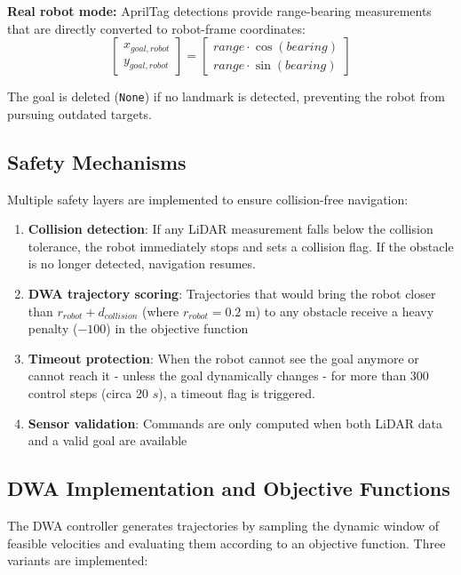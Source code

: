 \textbf{Real robot mode:} AprilTag detections provide range-bearing measurements that are directly converted to robot-frame coordinates:
\begin{equation}
    \begin{bmatrix} x_{goal,robot} \\ y_{goal,robot} \end{bmatrix} = 
    \begin{bmatrix} range \cdot \cos(bearing) \\ range \cdot \sin(bearing) \end{bmatrix}
\end{equation}

The goal is deleted (\texttt{None}) if no landmark is detected, preventing the robot from pursuing outdated targets.

\subsection{Safety Mechanisms}

Multiple safety layers are implemented to ensure collision-free navigation:

\begin{enumerate}
    \item \textbf{Collision detection}: If any LiDAR measurement falls below the collision tolerance, the robot immediately stops and sets a collision flag. If the obstacle is no longer detected, navigation resumes.
    \item \textbf{DWA trajectory scoring}: Trajectories that would bring the robot closer than $r_{robot} + d_{collision}$ (where $r_{robot} = 0.2$ m) to any obstacle receive a heavy penalty ($-100$) in the objective function
    \item \textbf{Timeout protection}: When the robot cannot see the goal anymore or cannot reach it - unless the goal dynamically changes - for more than 300 control steps (circa 20 $s$), a timeout flag is triggered.
    \item \textbf{Sensor validation}: Commands are only computed when both LiDAR data and a valid goal are available
\end{enumerate}

\subsection{DWA Implementation and Objective Functions}

The DWA controller generates trajectories by sampling the dynamic window of feasible velocities and evaluating them according to an objective function. Three variants are implemented:

